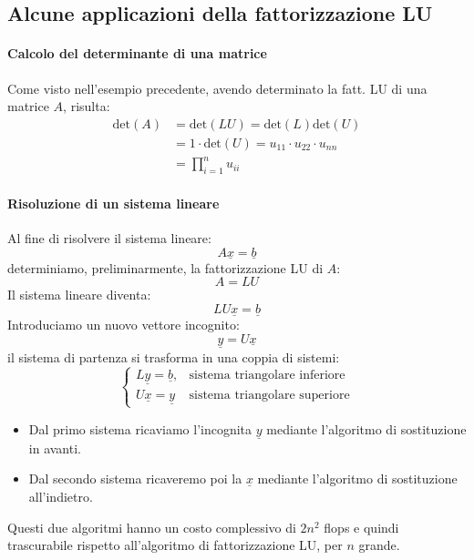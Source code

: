 \documentclass[12pt]{report}
\begin{document}
\subsection{Alcune applicazioni della fattorizzazione LU}
\paragraph{Calcolo del determinante di una matrice} Come visto nell'esempio precedente, avendo determinato la fatt. LU di una matrice $A$, risulta:
\begin{align*}
\text{det}(A) &= \text{det}(LU) = \text{det}(L)\text{det}(U) \\
&= 1 \cdot \text{det}(U) = u_{11} \cdot u_{22} \cdot u_{nn} \\
&= \prod_{i=1}^{n}u_{ii}
\end{align*}
\paragraph{Risoluzione di un sistema lineare}
Al fine di risolvere il sistema lineare:
\[
A\underline{x} = \underline{b}
\]
determiniamo, preliminarmente, la fattorizzazione LU di $A$:
\[
A = LU
\]
Il sistema lineare diventa:
\[
LU\underline{x} = \underline{b}
\]
Introduciamo un nuovo vettore incognito:
\[
\underline{y} = U\underline{x}
\]
il sistema di partenza si trasforma in una coppia di sistemi:
\[
\begin{cases}
	L\underline{y} = \underline{b}, &\text{sistema triangolare inferiore}\\
	U\underline{x} = \underline{y} &\text{sistema triangolare superiore}
\end{cases}
\]
\begin{itemize}
	\item Dal primo sistema ricaviamo l'incognita $\underline{y}$ mediante l'algoritmo di sostituzione in avanti.
	\item Dal secondo sistema ricaveremo poi la $\underline{x}$ mediante l'algoritmo di sostituzione all'indietro.
\end{itemize}
Questi due algoritmi hanno un costo complessivo di $2n^2$ flops e quindi trascurabile rispetto all'algoritmo di fattorizzazione LU, per $n$ grande.
\end{document}
